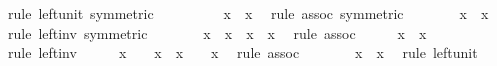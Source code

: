 \begin{isabellebody}
\ {\isacharparenleft}rule\ left{\isacharunderscore}unit\ {\isacharbrackleft}symmetric{\isacharbrackright}{\isacharparenright}\isanewline
\ \ \isamarkupfalse%
\ \isamarkupfalse%
\ {\isachardoublequoteopen}{\isasymdots}\ {\isacharequal}\ {\isacharparenleft}{}\ {\isasymcirc}\ x{\isacharparenright}\ {\isasymcirc}\ x{\isasyminverse}{\isachardoublequoteclose}\ \isamarkupfalse%
\ {\isacharparenleft}rule\ assoc\ {\isacharbrackleft}symmetric{\isacharbrackright}{\isacharparenright}\isanewline
\ \ \isamarkupfalse%
\ \isamarkupfalse%
\ {\isachardoublequoteopen}{}\ {\isacharequal}\ {\isacharparenleft}x{\isasyminverse}{\isacharparenright}{\isasyminverse}\ {\isasymcirc}\ x{\isasyminverse}{\isachardoublequoteclose}\ \isamarkupfalse%
\ {\isacharparenleft}rule\ left{\isacharunderscore}inv\ {\isacharbrackleft}symmetric{\isacharbrackright}{\isacharparenright}\isanewline
\ \ \isamarkupfalse%
\ \isamarkupfalse%
\ {\isachardoublequoteopen}{\isasymdots}\ {\isasymcirc}\ x\ {\isacharequal}\ {\isacharparenleft}x{\isasyminverse}{\isacharparenright}{\isasyminverse}\ {\isasymcirc}\ {\isacharparenleft}x{\isasyminverse}\ {\isasymcirc}\ x{\isacharparenright}{\isachardoublequoteclose}\ \isamarkupfalse%
\ {\isacharparenleft}rule\ assoc{\isacharparenright}\isanewline
\ \ \isamarkupfalse%
\ \isamarkupfalse%
\ {\isachardoublequoteopen}x{\isasyminverse}\ {\isasymcirc}\ x\ {\isacharequal}\ {}{\isachardoublequoteclose}\ \isamarkupfalse%
\ {\isacharparenleft}rule\ left{\isacharunderscore}inv{\isacharparenright}\isanewline
\ \ \isamarkupfalse%
\ \isamarkupfalse%
\ {\isachardoublequoteopen}{\isacharparenleft}{\isacharparenleft}x{\isasyminverse}{\isacharparenright}{\isasyminverse}\ {\isasymcirc}\ {\isasymdots}{\isacharparenright}\ {\isasymcirc}\ x{\isasyminverse}\ {\isacharequal}\ {\isacharparenleft}x{\isasyminverse}{\isacharparenright}{\isasyminverse}\ {\isasymcirc}\ {\isacharparenleft}{}\ {\isasymcirc}\ x{\isasyminverse}{\isacharparenright}{\isachardoublequoteclose}\ \isamarkupfalse%
\ {\isacharparenleft}rule\ assoc{\isacharparenright}\isanewline
\ \ \isamarkupfalse%
\ \isamarkupfalse%
\ {\isachardoublequoteopen}{}\ {\isasymcirc}\ x{\isasyminverse}\ {\isacharequal}\ x{\isasyminverse}{\isachardoublequoteclose}\ \isamarkupfalse%
\ {\isacharparenleft}rule\ left{\isacharunderscore}unit{\isacharparenright}\isanewline

\end{isabellebody}
